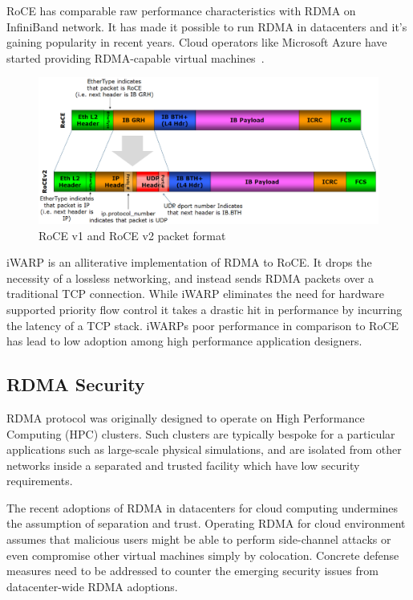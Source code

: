 RoCE has comparable raw performance characteristics with RDMA on InfiniBand
network. It has made it possible to run RDMA in datacenters and it's gaining
popularity in recent years. Cloud operators like Microsoft Azure have started
providing RDMA-capable virtual machines~\cite{news:azure.rdma}.

\begin{figure}[ht]
    \centering
    \includegraphics[width=\textwidth]{fig/RoCE_Header_format}
    \caption{RoCE v1 and RoCE v2 packet format}
    \label{fig:roce_header_format}
\end{figure}

iWARP is an alliterative implementation of RDMA to RoCE. It drops the necessity of
a lossless networking, and instead sends RDMA packets over a traditional TCP
connection. While iWARP eliminates the need for hardware supported priority flow
control it takes a drastic hit in performance by incurring the latency of a TCP
stack. iWARPs poor performance in comparison to RoCE has lead to low adoption
among high performance application designers.

\subsection{RDMA Security}

RDMA protocol was originally designed to operate on High Performance
Computing (HPC) clusters. Such clusters are typically bespoke for a particular applications such as
large-scale physical simulations, and are isolated from other networks inside a
separated and trusted facility which have low security requirements.

The recent adoptions of RDMA in datacenters for cloud computing undermines the
assumption of separation and trust. Operating RDMA for cloud environment assumes
that malicious users might be able to perform side-channel attacks or even
compromise other virtual machines simply by colocation.  Concrete defense
measures need to be addressed to counter the emerging security issues from
datacenter-wide RDMA adoptions.
 
